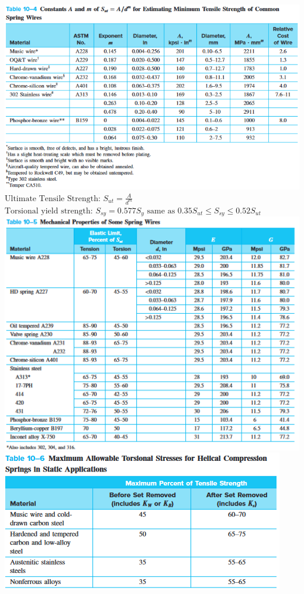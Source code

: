 \documentclass[11pt, fleqn]{article}
\begin{document}
\includegraphics[scale=0.7]{Springs/Tab10-4.png}\\
$\text{Ultimate Tensile Strength: } S_{ut} = \frac{A}{d^m}$\\
$\text{Torsional yield strength: } S_{sy} = 0.577S_y \text{ same as } 0.35S_{ut} \leq S_{sy} \leq 0.52S_{ut}$\\
\includegraphics[scale = 0.8]{Springs/Tab10-5.png}\\
\includegraphics[scale = 0.9]{Springs/Tab10-6.png}\\
\end{document}
